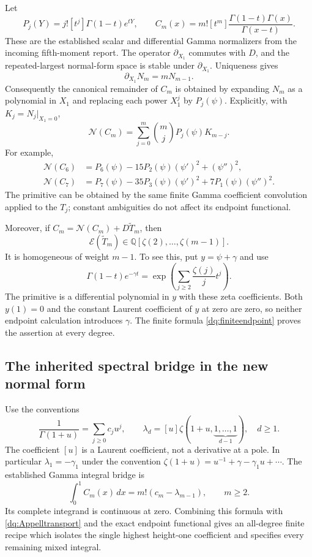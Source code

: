 \documentclass[11pt,a4paper]{article}
\numberwithin{equation}{section}
\theoremstyle{plain}
\theoremstyle{definition}
\theoremstyle{remark}
\begin{document}
Let
\[
 P_j(Y)=j![t^j]\Gamma(1-t)e^{tY},\qquad
 C_m(x)=m![t^m]\frac{\Gamma(1-t)\Gamma(x)}{\Gamma(x-t)}.
\]
These are the established scalar and differential Gamma normalizers
from the incoming fifth-moment report. The operator $\partial_{X_1}$
commutes with $D$, and the repeated-largest normal-form space is
stable under $\partial_{X_1}$. Uniqueness gives
\[
 \partial_{X_1}N_m=mN_{m-1}.
\]
Consequently the canonical remainder of $C_m$ is obtained by expanding
$N_m$ as a polynomial in $X_1$ and replacing each power $X_1^j$ by
$P_j(\psi)$. Explicitly, with $K_j=N_j|_{X_1=0}$,
\begin{equation}\label{dq:Appelltransport}
 \mathcal N(C_m)=\sum_{j=0}^m\binom mj P_j(\psi)K_{m-j}.
\end{equation}
For example,
\begin{align}
 \mathcal N(C_6)&=P_6(\psi)-15P_2(\psi)(\psi')^2+(\psi'')^2,
 \label{dq:C6normal}\\
 \mathcal N(C_7)&=P_7(\psi)-35P_3(\psi)(\psi')^2
                                  +7P_1(\psi)(\psi'')^2.
 \label{dq:C7normal}
\end{align}
The primitive can be obtained by the same finite Gamma coefficient
convolution applied to the $T_j$; constant ambiguities do not affect
its endpoint functional.

Moreover, if $C_m=\mathcal N(C_m)+D\widetilde T_m$, then
\begin{equation}\label{dq:Appellendpointalgebra}
 \mathcal E(\widetilde T_m)\in
            \mathbb Q[\zeta(2),\ldots,\zeta(m-1)].
\end{equation}
It is homogeneous of weight $m-1$. To see this, put $y=\psi+\gamma$
and use
\[
 \Gamma(1-t)e^{-\gamma t}
  =\exp\left(\sum_{j\ge2}\frac{\zeta(j)}j t^j\right).
\]
The primitive is a differential polynomial in $y$ with these zeta
coefficients. Both $y(1)=0$ and the constant Laurent coefficient of
$y$ at zero are zero, so neither endpoint calculation introduces
$\gamma$. The finite formula \eqref{dq:finiteendpoint} proves
the assertion at every degree.

\subsection{The inherited spectral bridge in the new normal form}

Use the conventions
\[
 \frac1{\Gamma(1+u)}=\sum_{j\ge0}c_ju^j,\qquad
 \lambda_d=[u]\zeta(1+u,\underbrace{1,\ldots,1}_{d-1}),
 \quad d\ge1.
\]
The coefficient $[u]$ is a Laurent coefficient, not a derivative at
a pole. In particular $\lambda_1=-\gamma_1$ under the convention
$\zeta(1+u)=u^{-1}+\gamma-\gamma_1u+\cdots$.
The established Gamma integral bridge is
\begin{equation}\label{dq:inheritedCbridge}
 \int_0^1C_m(x)\,dx=m!(c_m-\lambda_{m-1}),\qquad m\ge2.
\end{equation}
Its complete integrand is continuous at zero. Combining this formula
with \eqref{dq:Appelltransport} and the exact endpoint functional
gives an all-degree finite recipe which isolates the single highest
height-one coefficient and specifies every remaining mixed integral.
\end{document}
